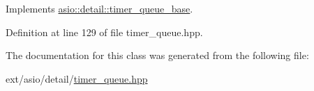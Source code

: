 Implements \hyperlink{classasio_1_1detail_1_1timer__queue__base_a0ede8e7cf51da9a53ffc4b76e4ddeb9f}{asio\+::detail\+::timer\+\_\+queue\+\_\+base}.



Definition at line 129 of file timer\+\_\+queue.\+hpp.



The documentation for this class was generated from the following file\+:\begin{DoxyCompactItemize}
\item 
ext/asio/detail/\hyperlink{timer__queue_8hpp}{timer\+\_\+queue.\+hpp}\end{DoxyCompactItemize}
